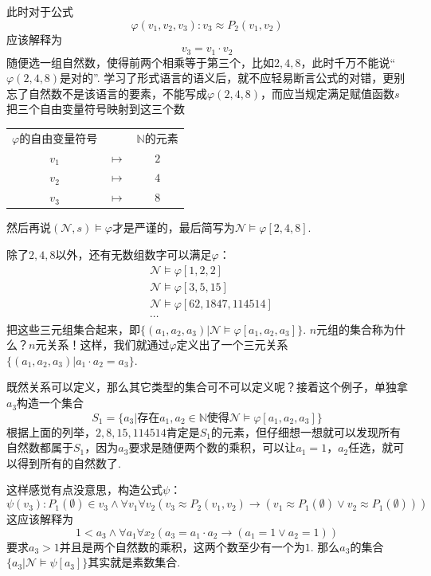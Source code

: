 \documentclass[main.tex]{subfiles}
\begin{document}
此时对于公式
\[\varphi(v_1,v_2,v_3): v_3 \approx P_2(v_1,v_2)\]
应该解释为
\[v_3 = v_1 \cdot v_2\]
随便选一组自然数，使得前两个相乘等于第三个，比如\(2,4,8\)，此时千万不能说“\(\varphi(2,4,8)\)是对的”. 学习了形式语言的语义后，就不应轻易断言公式的对错，更别忘了自然数不是该语言的要素，不能写成\(\varphi(2,4,8)\)，而应当规定满足赋值函数\(s\)把三个自由变量符号映射到这三个数
\begin{center}
    \begin{tabular}{ccc}
        \(\varphi\)的自由变量符号 & & \(\mathbb{N}\)的元素 \\
        \(v_1\) & \(\longmapsto\) & \(2\) \\
        \(v_2\) & \(\longmapsto\) & \(4\) \\
        \(v_3\) & \(\longmapsto\) & \(8\)
    \end{tabular}
\end{center}
然后再说\((\mathcal{N},s) \vDash \varphi\)才是严谨的，最后简写为\(\mathcal{N}\vDash \varphi[2,4,8]\). 

除了\(2,4,8\)以外，还有无数组数字可以满足\(\varphi\)：
\begin{align*}
    & \mathcal{N} \vDash \varphi[1,2,2] \\
    & \mathcal{N} \vDash \varphi[3,5,15] \\
    & \mathcal{N} \vDash \varphi[62,1847,114514] \\
    & \cdots
\end{align*}
把这些三元组集合起来，即\(\{(a_1,a_2,a_3)|\mathcal{N} \vDash \varphi[a_1,a_2,a_3]\}\). \(n\)元组的集合称为什么？\(n\)元关系！这样，我们就通过\(\varphi\)定义出了一个三元关系\(\{(a_1,a_2,a_3)|a_1 \cdot a_2 = a_3\}\).

既然关系可以定义，那么其它类型的集合可不可以定义呢？接着这个例子，单独拿\(a_3\)构造一个集合
\[S_1 = \{a_3|\mbox{存在}a_1,a_2 \in \mathbb{N}\mbox{使得}\mathcal{N} \vDash \varphi[a_1,a_2,a_3]\}\]
根据上面的列举，\(2,8,15,114514\)肯定是\(S_1\)的元素，但仔细想一想就可以发现所有自然数都属于\(S_1\)，因为\(a_3\)要求是随便两个数的乘积，可以让\(a_1=1\)，\(a_2\)任选，就可以得到所有的自然数了. 

这样感觉有点没意思，构造公式\(\psi\)：
\[\psi(v_3): P_1(\emptyset) \in v_3 \wedge \forall v_1 \forall v_2(v_3 \approx P_2(v_1,v_2) \to (v_1 \approx P_1(\emptyset) \vee v_2 \approx P_1(\emptyset)))\]
这应该解释为
\[1 < a_3 \wedge \forall a_1 \forall x_2 (a_3=a_1 \cdot a_2 \to (a_1=1 \vee a_2=1))\]
要求\(a_3>1\)并且是两个自然数的乘积，这两个数至少有一个为\(1\). 那么\(a_3\)的集合\(\{a_3|\mathcal{N} \vDash \psi[a_3]\}\)其实就是素数集合.
\end{document}
